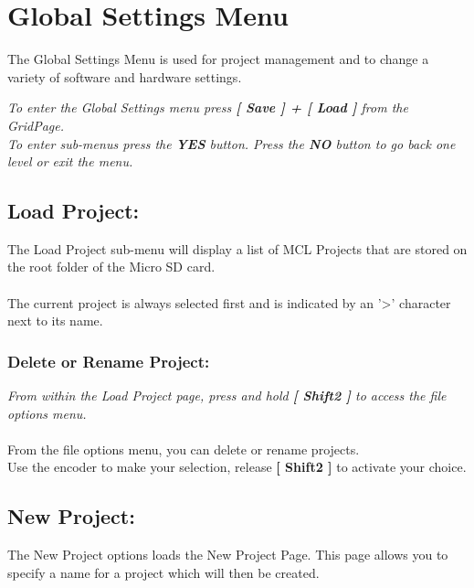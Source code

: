 \chapter{Global Settings Menu}
The Global Settings Menu is used for project management and to change a variety of software and hardware settings.


\textit{To enter the Global Settings menu press \textbf{[ Save ] + [ Load ]} from the GridPage.\\
To enter sub-menus press the \textbf{YES} button. Press the \textbf{NO} button to go back one level or exit the menu.}
\section{Load Project:}
The Load Project sub-menu will display a list of MCL Projects that are stored on the root folder of the Micro SD card.\\\\
The current project is always selected first and is indicated by an '>' character next to its name.

\subsection{Delete or Rename Project:}
\textit{From within the Load Project page, press and hold \textbf{[ Shift2 ]} to access the file options menu.}\\\\
From the file options menu, you can delete or rename projects.\\
Use the encoder to make your selection, release \textbf{[ Shift2 ]} to activate your choice.

\newpage
\section{New Project:}
The New Project options loads the New Project Page. This page allows you to specify a name for a project which will then be created.\\

